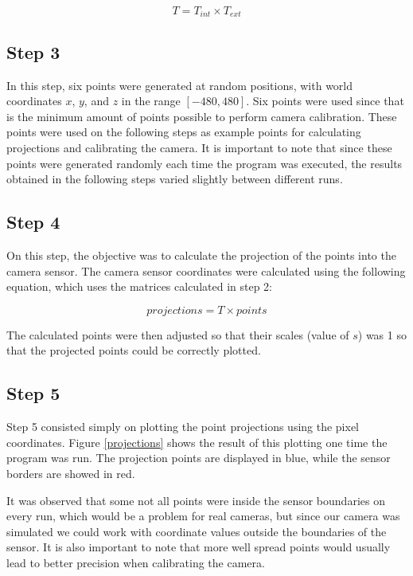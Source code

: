 \documentclass[journal]{IEEEtran}
\begin{document}
\[
T = T_{int} \times T_{ext}
\]

\subsection{Step 3}

In this step, six points were generated at random positions, with world coordinates $x$, $y$, and $z$  in the range $[-480,480]$. Six points were used since that is the minimum amount of points possible to perform camera calibration. These points were used on the following steps as example points for calculating projections and calibrating the camera. It is important to note that since these points were generated randomly each time the program was executed, the results obtained in the following steps varied slightly between different runs.

\subsection{Step 4}

On this step, the objective was to calculate the projection of the points into the camera sensor. The camera sensor coordinates were calculated using the following equation, which uses the matrices calculated in step 2:

\[
projections = T \times points
\]

The calculated points were then adjusted so that their scales (value of $s$) was 1 so that the projected points could be correctly plotted.

\subsection{Step 5}

Step 5 consisted simply on plotting the point projections using the pixel coordinates. Figure \ref{projections} shows the result of this plotting one time the program was run. The projection points are displayed in blue, while the sensor borders are showed in red. 

It was observed that some not all points were inside the sensor boundaries on every run, which would be a problem for real cameras, but since our camera was simulated we could work with coordinate values outside the boundaries of the sensor. It is also important to note that more well spread points would usually lead to better precision when calibrating the camera.
\end{document}
